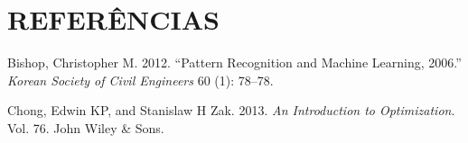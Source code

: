 \documentclass[
	12pt,				%
	a4paper,		%
	oneside,    %
	chapter=TITLE,		   %
	section=TITLE,		   %
	subsection=TITLE,	   %
	subsubsection=TITLE, %
	english,			%
	french,				%
	spanish,			%
	brazil,				%
]{abntex2}
\begin{document}
\newpage

\hypertarget{referuxeancias}{%
\chapter*{REFERÊNCIAS}\label{referuxeancias}}

\hypertarget{refs}{}
\leavevmode\hypertarget{ref-bishop2012pattern}{}%
Bishop, Christopher M. 2012. ``Pattern Recognition and Machine Learning,
2006.'' \emph{Korean Society of Civil Engineers} 60 (1): 78--78.

\leavevmode\hypertarget{ref-chong2013introduction}{}%
Chong, Edwin KP, and Stanislaw H Zak. 2013. \emph{An Introduction to
Optimization}. Vol. 76. John Wiley \& Sons.

\postextual



\printindex
\end{document}
